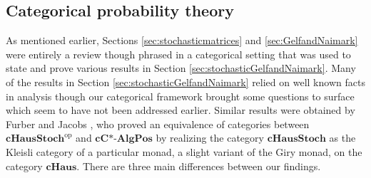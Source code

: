 \documentclass[12pt]{article}
\theoremstyle{theorem}
\theoremstyle{definition}
\numberwithin{equation}{section}
\newcommand{\<}{\langle}
\renewcommand{\>}{\rangle}
\newcommand{\cCAlgPos}{\mathbf{cC\text{*-}AlgPos}}
\newcommand{\op}{\mathrm{op}}
\newcommand{\cH}{\mathbf{cHaus}}
\newcommand{\cHStoch}{\mathbf{cHausStoch}}
\begin{document}
\subsection{Categorical probability theory}
\label{sec:relationshiptoCTPT}

As mentioned earlier, Sections \ref{sec:stochasticmatrices} and 
\ref{sec:GelfandNaimark} were entirely a review though phrased in 
a categorical setting that was used to state and prove various results in 
Section \ref{sec:stochasticGelfandNaimark}. 
Many of the results in Section \ref{sec:stochasticGelfandNaimark} 
relied on well known facts in analysis though our categorical framework
brought some questions to surface which seem to have not been 
addressed earlier. 
Similar results were obtained by
Furber and Jacobs \cite{FuJa13}, who
proved an equivalence
of categories between $\cHStoch^{\op}$ and $\cCAlgPos$ by
realizing the category $\cHStoch$ 
as the Kleisli category of a particular monad, a slight variant of the Giry monad, 
on the category $\cH.$ 
There are three main differences between our findings.
\end{document}
